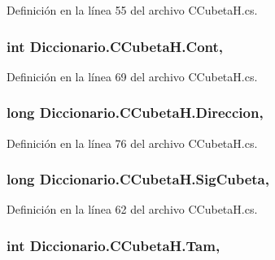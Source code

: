 Definición en la línea 55 del archivo C\-Cubeta\-H.\-cs.

\hypertarget{class_diccionario_1_1_c_cubeta_h_a6aa13e9752f773a861f70ed202d85b88}{
\subsubsection[{Cont}]{\setlength{\rightskip}{0pt plus 5cm}int Diccionario.\-C\-Cubeta\-H.\-Cont\hspace{0.3cm}{\ttfamily [get]}, {\ttfamily [set]}}}\label{class_diccionario_1_1_c_cubeta_h_a6aa13e9752f773a861f70ed202d85b88}


Definición en la línea 69 del archivo C\-Cubeta\-H.\-cs.

\hypertarget{class_diccionario_1_1_c_cubeta_h_a8d6582c916b381c79137454cbf18ff95}{
\subsubsection[{Direccion}]{\setlength{\rightskip}{0pt plus 5cm}long Diccionario.\-C\-Cubeta\-H.\-Direccion\hspace{0.3cm}{\ttfamily [get]}, {\ttfamily [set]}}}\label{class_diccionario_1_1_c_cubeta_h_a8d6582c916b381c79137454cbf18ff95}


Definición en la línea 76 del archivo C\-Cubeta\-H.\-cs.

\hypertarget{class_diccionario_1_1_c_cubeta_h_a7fdc9085d4c1620faf00e75bced75fdd}{
\subsubsection[{Sig\-Cubeta}]{\setlength{\rightskip}{0pt plus 5cm}long Diccionario.\-C\-Cubeta\-H.\-Sig\-Cubeta\hspace{0.3cm}{\ttfamily [get]}, {\ttfamily [set]}}}\label{class_diccionario_1_1_c_cubeta_h_a7fdc9085d4c1620faf00e75bced75fdd}


Definición en la línea 62 del archivo C\-Cubeta\-H.\-cs.

\hypertarget{class_diccionario_1_1_c_cubeta_h_a2d9ab2991a882be8145176f5e539c392}{
\subsubsection[{Tam}]{\setlength{\rightskip}{0pt plus 5cm}int Diccionario.\-C\-Cubeta\-H.\-Tam\hspace{0.3cm}{\ttfamily [get]}, {\ttfamily [set]}}}\label{class_diccionario_1_1_c_cubeta_h_a2d9ab2991a882be8145176f5e539c392}


